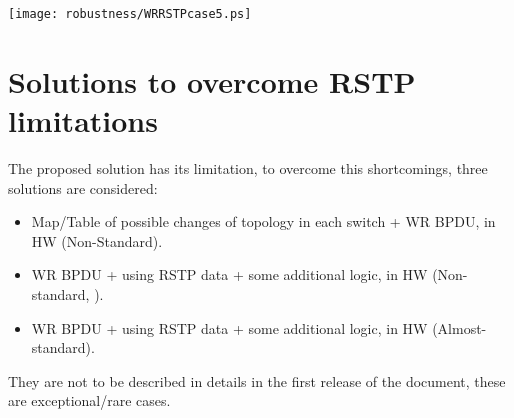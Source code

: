 \begin{center}
	\texttt{[image: robustness/WRRSTPcase5.ps]}
	\label{fig:WRRSTPcase5}
\end{center}

\section{Solutions to overcome RSTP limitations}
The proposed solution has its limitation, to overcome this shortcomings, three
solutions are considered:
\begin{itemize}
  \item Map/Table of possible changes of topology in each
switch + WR BPDU, in HW (Non-Standard). 
  \item WR BPDU + using RSTP data + some additional logic, in HW (Non-standard,
).
  \item WR BPDU + using RSTP data + some additional logic, in HW
(Almost-standard).
\end{itemize}
They are not to be described in details in the first release of the document,
these are exceptional/rare cases.
